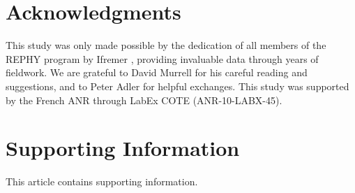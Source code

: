 \documentclass[10pt]{article}
\begin{document}
\section*{Acknowledgments}

This study was only made possible by the dedication of all members
of the REPHY program by Ifremer \citep{REPHY_db}, providing invaluable
data through years of fieldwork. We are grateful to David Murrell
for his careful reading and suggestions, and to Peter Adler for helpful
exchanges. This study was supported by the French ANR through LabEx
COTE (ANR-10-LABX-45).

\section*{Supporting Information}

This article contains supporting information.

\nolinenumbers %
%
 

\end{document}
